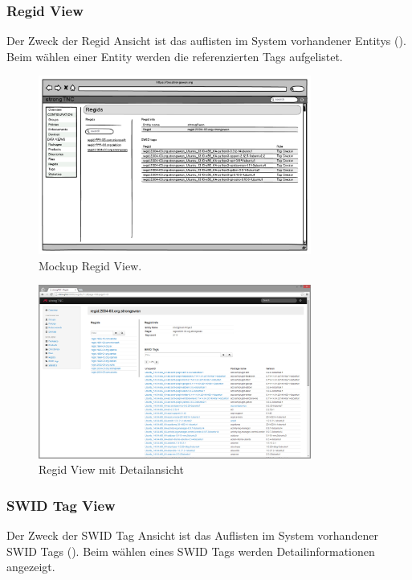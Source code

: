 \subsubsection{Regid View}
Der Zweck der Regid Ansicht ist das auflisten im System vorhandener Entitys ().
Beim wählen einer Entity werden die referenzierten Tags aufgelistet. 
\begin{figure}[H]
\centering
\includegraphics[width=0.8\textwidth]{./images/mockups/swid-regid-view}
\caption{Mockup Regid View.}
\label{fig:swid-regid-view}
\end{figure}
\begin{figure}[H]
\centering
\includegraphics[width=0.8\textwidth]{./images/Views/regid-view}
\caption{Regid View mit Detailansicht}
\label{fig:regid-view}
\end{figure}

\subsubsection{SWID Tag View}
Der Zweck der SWID Tag Ansicht ist das Auflisten im System vorhandener SWID Tags ().
Beim wählen eines SWID Tags werden Detailinformationen angezeigt.

